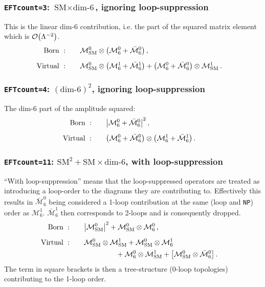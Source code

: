 \documentclass[11pt,a4paper]{refrep}
\def\M{\mathcal{M}}
\begin{document}
\subsubsection*{\bf\boldmath\texttt{EFTcount=3}: $\text{SM}\times\text{dim-6}$, ignoring loop-suppression}
This is the linear dim-6 contribution, i.e. the part of the squared matrix element which is $\order{\Lambda^{-2}}$.
\begin{align}
    \text{Born }: &\qquad \M_\mathrm{SM}^0\otimes\qty(\M_6^0+\bar{\M}_6^0)\,,&\\[5pt]
    \text{Virtual }: &\qquad \M_\mathrm{SM}^0\otimes\qty(\M_6^1+\bar{\M}_6^1) + \qty(\M_6^0+\bar{\M}_6^0)\otimes\M_\mathrm{SM}^1\,.&
\end{align}

\subsubsection*{\bf\boldmath\texttt{EFTcount=4}: $(\text{dim-6})^2$, ignoring loop-suppression}
The dim-6 part of the amplitude squared:
\begin{align}
    \text{Born }: &\qquad \abs{\M_6^0+\bar{\M}_6^0}^2\,,&\\[5pt]
    \text{Virtual }: &\qquad \qty(\M_6^0+\bar{\M}_6^0)\otimes\qty(\M_6^1+\bar{\M}_6^1)\,.&
\end{align}

\subsubsection*{\bf\boldmath\texttt{EFTcount=11}: $\text{SM}^2+\text{SM}\times\text{dim-6}$, with loop-suppression}
``With loop-suppression'' means that the loop-suppressed operators are treated as introducing a loop-order to the diagrams they are contributing to. Effectively this results in $\bar{\M}_6^0$ being considered a 1-loop contribution at the same (loop and \texttt{NP}) order as $\M_6^1$. $\bar{\M}_6^1$ then corresponds to 2-loops and is consequently dropped.
\begin{align}
    \text{Born }: &\qquad \abs{\M_\mathrm{SM}^0}^2 + \M_\mathrm{SM}^0\otimes\M_6^0\,,&\\[5pt]
    \text{Virtual }: &\qquad \M_\mathrm{SM}^0\otimes\M_\mathrm{SM}^1 + \M_\mathrm{SM}^0\otimes\M_6^1\notag\\&\hspace{65pt} + \M_6^0\otimes\M_\mathrm{SM}^1 + \qty[\M_\mathrm{SM}^0\otimes\bar{\M}_6^0]\,.&
\end{align}
The term in square brackets is then a tree-structure (0-loop topologies) contributing to the 1-loop order.
\end{document}
